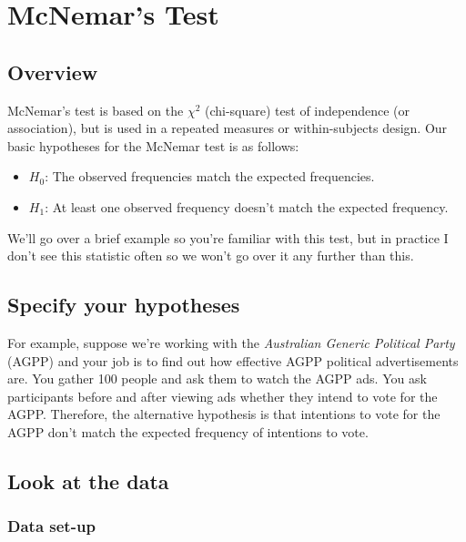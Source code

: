\documentclass[
]{book}
\begin{document}
\hypertarget{mcnemars-test}{%
\section{McNemar's Test}\label{mcnemars-test}}

\hypertarget{overview-5}{%
\subsection{Overview}\label{overview-5}}

McNemar's test is based on the \(\chi^2\) (chi-square) test of independence (or association), but is used in a repeated measures or within-subjects design. Our basic hypotheses for the McNemar test is as follows:

\begin{itemize}
\item
  \(H_0\): The observed frequencies match the expected frequencies.
\item
  \(H_1\): At least one observed frequency doesn't match the expected frequency.
\end{itemize}

We'll go over a brief example so you're familiar with this test, but in practice I don't see this statistic often so we won't go over it any further than this.

\hypertarget{specify-your-hypotheses-3}{%
\subsection{Specify your hypotheses}\label{specify-your-hypotheses-3}}

For example, suppose we're working with the \emph{Australian Generic Political Party} (AGPP) and your job is to find out how effective AGPP political advertisements are. You gather 100 people and ask them to watch the AGPP ads. You ask participants before and after viewing ads whether they intend to vote for the AGPP. Therefore, the alternative hypothesis is that intentions to vote for the AGPP don't match the expected frequency of intentions to vote.

\hypertarget{look-at-the-data-5}{%
\subsection{Look at the data}\label{look-at-the-data-5}}

\hypertarget{data-set-up-5}{%
\subsubsection{Data set-up}\label{data-set-up-5}}
\end{document}
